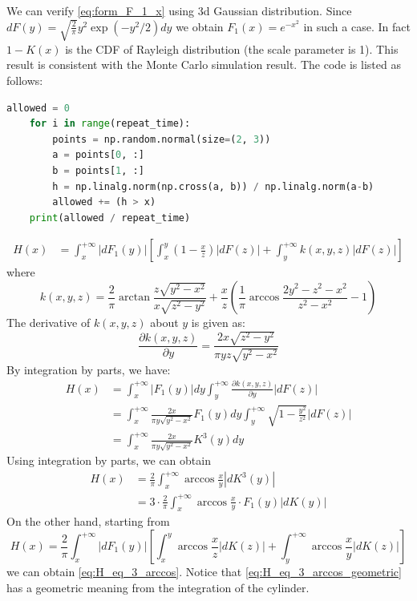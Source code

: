 \documentclass{article}
\begin{document}
We can verify \eqref{eq:form_F_1_x} using 3d 
Gaussian distribution.
Since $dF(y)= \sqrt{\frac{2}{\pi}} y^2\exp(-y^2/2)dy$
we obtain $F_1(x)=e^{-x^2}$ in such a case.
In fact $1-K(x)$ is the CDF of Rayleigh distribution
(the scale parameter is 1). 
This result is consistent
with the Monte Carlo simulation result. The code is listed
as follows:
\begin{lstlisting}[language=Python]
    allowed = 0
    for i in range(repeat_time):
        points = np.random.normal(size=(2, 3))
        a = points[0, :]
        b = points[1, :]
        h = np.linalg.norm(np.cross(a, b)) / np.linalg.norm(a-b)
        allowed += (h > x)
    print(allowed / repeat_time)
    \end{lstlisting}
\begin{align}
    H(x) & = \int_x^{+\infty}|dF_1(y)|
        \left[\int_x^{y} (1-\frac{x}{z}) |dF(z)|    
        + \int_y^{+\infty} k(x,y,z)|dF(z)|
        \right]
\end{align}
where
\begin{equation}
    k(x,y,z) = \frac{2}{\pi} \arctan \frac{z\sqrt{y^2-x^2}}{x\sqrt{z^2-y^2}}
    + \frac{x}{z}\left(\frac{1}{\pi} \arccos \frac{2y^2-z^2-x^2}{z^2-x^2}-1
    \right)
\end{equation}
The derivative of $k(x,y,z)$ about $y$ is given as:
\begin{equation*}
    \frac{\partial k(x,y,z)}{\partial y}
=\frac{2x \sqrt{z^2-y^2}}{\pi yz \sqrt{y^2-x^2}}
\end{equation*}
By integration by parts, we have:
\begin{align}
    H(x) & = \int_x^{+\infty}|F_1(y)|dy
\int_y^{+\infty} \frac{\partial k(x,y,z)}{\partial y}
|dF(z)| \\
& = \int_x^{+\infty}\frac{2x }{\pi y \sqrt{y^2-x^2}}F_1(y)dy
\int_y^{+\infty} \sqrt{1-\frac{y^2}{z^2}}\label{eq:H_general_simplification}
|dF(z)| \\
& = \int_x^{+\infty}\frac{2x }{\pi y \sqrt{y^2-x^2}}K^3(y)dy
\end{align}
Using integration by parts, we can obtain
\begin{align}
    H(x) &=\frac{2}{\pi}\int_x^{+\infty}
    \arccos\frac{x}{y} |d K^3(y)|\\
    &=3\cdot \frac{2}{\pi}\int_x^{+\infty}
    \arccos\frac{x}{y} \cdot F_1(y)|dK(y)|\label{eq:H_eq_3_arccos}
\end{align}
On the other hand, starting from
\begin{equation}\label{eq:H_eq_3_arccos_geometric}
H(x) = \frac{2}{\pi}\int_x^{+\infty}|dF_1(y)|
\left[ \int_x^y \arccos\frac{x}{z}|dK(z)|
+\int_y^{+\infty}\arccos\frac{x}{y} |dK(z)|\right]
\end{equation}
we can obtain \eqref{eq:H_eq_3_arccos}.
Notice that \eqref{eq:H_eq_3_arccos_geometric} has
a geometric meaning from the integration of the cylinder.
\end{document}
